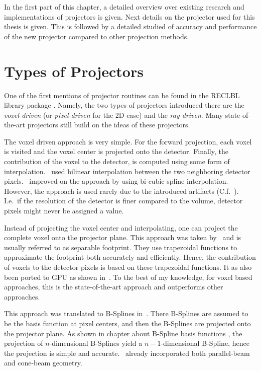 In the first part of this chapter, a detailed overview over existing research and implementations of
projectors is given. Next details on the projector used for this thesis is given. This is followed
by a detailed studied of accuracy and performance of the new projector compared to other projection
methods.

\section{Types of Projectors}\label{sec:projector_types}

One of the first mentions of projector routines can be found in the RECLBL library package
. Namely, the two types of projectors introduced there are the
\textit{voxel-driven} (or \textit{pixel-driven} for the 2D case) and the \textit{ray driven}. Many
state-of-the-art projectors still build on the ideas of these projectors.

The voxel driven approach is very simple. For the forward projection, each voxel is visited and the
voxel center is projected onto the detector. Finally, the contribution of the voxel to the detector,
is computed using some form of interpolation.~\cite{peters_algorithms_1981} used bilinear
interpolation between the two neighboring detector pixels.~\cite{harauz_interpolation_1983}
improved on the approach by using bi-cubic spline interpolation. However, the approach is used
rarely due to the introduced artifacts (C.f.~\cite[Chapter~3.3]{levakhina_three-dimensional_2014}).
I.e.\ if the resolution of the detector is finer compared to the volume, detector pixels might never
be assigned a value. 

Instead of projecting the voxel center and interpolating, one can project the complete voxel onto
the projector plane. This approach was taken by~\cite{long_3d_2010, long_3d_nodate} and is usually
referred to as separable footprint. They use trapezoidal functions to approximate the footprint both
accurately and efficiently. Hence, the contribution of voxels to the detector pixels is based on
these trapezoidal functions. It as also been ported to \gls{GPU} as shown in~\cite{wu_gpu_2011,
	xie_effective_2015, chapdelaine_new_nodate}. To the best of my knowledge, for voxel based
approaches, this is the state-of-the-art approach and outperforms other approaches.

This approach was translated to B-Splines in~\cite{momey_b-spline_2012, momey_spline_2015}. There
B-Splines are assumed to be the basis function at pixel centers, and then the B-Splines are
projected onto the projector plane. As shown in chapter about B-Spline basis functions
, the projection of \(n\)-dimensional B-Splines yield a
\(n-1\)-dimensional B-Spline, hence the projection is simple and
accurate.~\cite{momey_b-spline_2012} already incorporated both parallel-beam and cone-beam
geometry.

